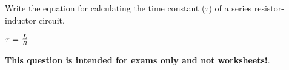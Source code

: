 

Write the equation for calculating the time constant ($\tau$) of a series resistor-inductor circuit.







$\tau = {L \over R}$







{\bf This question is intended for exams only and not worksheets!}.



